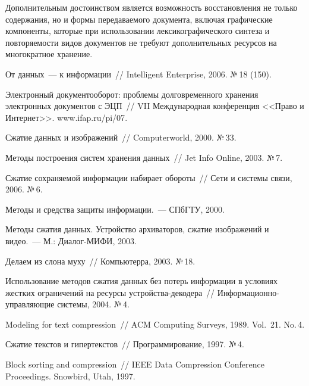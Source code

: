 \begin{multicols}{2}
Дополнительным достоинством является 
возможность восстановления не только содержания, но и формы передаваемого 
документа, включая графические компоненты, которые при использовании 
лексикографического синтеза и по\-вто\-ря\-емости видов документов не требуют 
дополнительных ресурсов на многократное хранение.

{\small\frenchspacing
{%
\begin{thebibliography}{99}    

От данных~--- к информации~// Intelligent Enterprise, 2006. №\,18 (150).

Электронный документооборот: проб\-ле\-мы долговременного хранения электронных 
документов с ЭЦП~// VII Международная конференция <<Право и Интернет>>. 
{\sf www.ifap.ru/pi/07}.

Сжатие данных и изображений~// Computerworld, 2000. №\,33.

Методы построения систем хранения данных~// Jet Info Online, 2003. №\,7.

Сжатие сохраняемой информации набирает обороты~// Сети и системы связи, 2006. №\,6.

Методы и средства защиты информации.~--- СПбГТУ, 2000.

Методы сжатия данных. Устройство архиваторов, сжатие изображений и видео.~--- М.: 
Диалог-МИФИ, 2003.

Делаем из слона муху~// Компьютерра, 2003. №\,18.

Использование методов сжатия данных без потерь информации в условиях жестких 
ограничений на ресурсы устройства-декодера~// Информационно-управляющие системы, 
2004. №\,4.

Modeling for text compression~// ACM Computing Surveys, 1989. Vol.~21. No.\,4.


Сжатие текстов и гипертекстов~// Программирование, 1997. №\,4.

Block sorting and compression~// IEEE Data Compression Conference Proceedings. Snowbird, Utah, 
1997.


\end{thebibliography}}}
\end{multicols}
